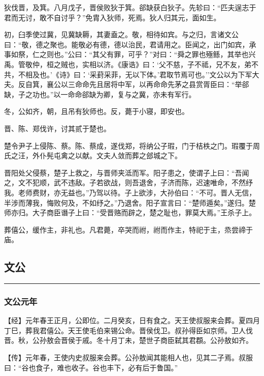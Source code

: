 \documentclass[]{article}
\begin{document}
狄伐晋，及箕。八月戊子，晋侯败狄于箕。郤缺获白狄子。先轸曰：``匹夫逞志于君而无讨，敢不自讨乎？''免胄入狄师，死焉。狄人归其元，面如生。

初，臼季使过冀，见冀缺耨，其妻盍之。敬，相待如宾。与之归，言诸文公曰：``敬，德之聚也。能敬必有德，德以治民，君请用之。臣闻之，出门如宾，承事如祭，仁之则也。''公曰：``其父有罪，可乎？''对曰：``舜之罪也殛鲧，其举也兴禹。管敬仲，桓之贼也，实相以济。《康诰》曰：`父不慈，子不祗，兄不友，弟不共，不相及也。'《诗》曰：`采葑采菲，无以下体。'君取节焉可也。''文公以为下军大夫。反自箕，襄公以三命命先且居将中军，以再命命先茅之县赏胥臣曰：``举郤缺，子之功也。''以一命命郤缺为卿，复与之冀，亦未有军行。

冬，公如齐，朝，且吊有狄师也。反，薨于小寝，即安也。

晋、陈、郑伐许，讨其贰于楚也。

楚令尹子上侵陈、蔡。陈、蔡成，遂伐郑，将纳公子瑕，门于桔柣之门。瑕覆于周氏之汪，外仆髡屯禽之以献。文夫人敛而葬之郐城之下。

晋阳处父侵蔡，楚子上救之，与晋师夹泜而军。阳子患之，使谓子上曰：``吾闻之，文不犯顺，武不违敌。子若欲战，则吾退舍，子济而陈，迟速唯命，不然纾我。老师费财，亦无益也。''乃驾以待。子上欲涉，大孙伯曰：``不可。晋人无信，半涉而薄我，悔败何及，不如纾之。''乃退舍。阳子宣言曰：``楚师遁矣。''遂归。楚师亦归。大子商臣谮子上曰：``受晋赂而辟之，楚之耻也，罪莫大焉。''王杀子上。

葬僖公，缓作主，非礼也。凡君薨，卒哭而祔，祔而作主，特祀于主，烝尝禘于庙。

\hypertarget{header-n1046}{%
\subsection{文公}\label{header-n1046}}

\begin{center}\rule{0.5\linewidth}{\linethickness}\end{center}

\hypertarget{header-n1048}{%
\subsubsection{文公元年}\label{header-n1048}}

【经】元年春王正月，公即位。二月癸亥，日有食之。天王使叔服来会葬。夏四月丁巳，葬我君僖公。天王使毛伯来锡公命。晋侯伐卫。叔孙得臣如京师。卫人伐晋。秋，公孙敖会晋侯于戚。冬十月丁未，楚世子商臣弑其君頵。公孙敖如齐。

【传】元年春，王使内史叔服来会葬。公孙敖闻其能相人也，见其二子焉。叔服曰：``谷也食子，难也收子。谷也丰下，必有后于鲁国。''
\end{document}
